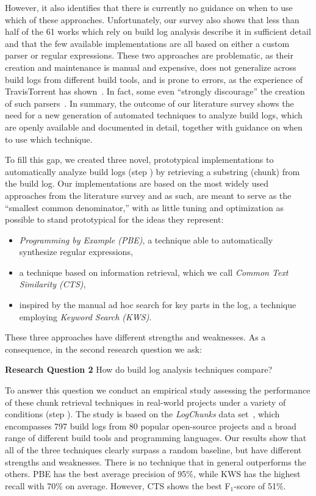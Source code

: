 \documentclass[10pt,journal,compsoc]{IEEEtran}
\newcommand\circlenum[1]{\raisebox{1.2pt}{\textcircled{\hspace{0.35pt}\scriptsize{\raisebox{-.4pt}{#1}}}}}
\begin{document}
However, it also identifies that there is currently no guidance on when
to use which of these
approaches.
Unfortunately, our survey also shows that
less than half of the 61 works which rely on build log analysis
describe it in sufficient detail and that
the few available implementations are all based on either a custom parser
or regular expressions.
These two approaches are problematic, as their creation
and maintenance is manual and expensive, does not generalize across build
logs from different build tools, and is prone to errors,
as the experience of
TravisTorrent has
shown~\cite{beller2017travistorrent,travistorrentquestions}.
In fact, some even ``strongly discourage'' the creation of such
parsers~\cite{urli2018design}.
In summary, the outcome of our literature survey shows the need for a new
generation of automated techniques to analyze build logs, which are
openly available and documented in detail, together with
guidance on when to use which technique.

To fill this gap, we created three novel, prototypical implementations
to automatically analyze build logs (step \circlenum{2}) by retrieving
a substring (chunk)
from the build log.
Our
implementations are based on the most widely used approaches
from the literature survey and as such, are meant to serve as
the ``smallest common denominator,'' with as little tuning and
optimization as possible to stand prototypical for the ideas
they represent:
\begin{itemize}
	\item \emph{Programming by Example (PBE)}, a technique
	able to
	automatically synthesize regular expressions,
	\item a technique based on information
	retrieval, which we call \emph{Common Text Similarity (CTS)},
	\item inspired by the manual ad hoc search for key parts in the
	log, a
	technique employing \emph{Keyword Search (KWS)}.
\end{itemize}

These three approaches have
different strengths and weaknesses.
As a consequence,
in the second research question we ask:

\begin{simplebox}[minipage boxed title*=-5cm]{\textbf{Research Question
2}}
How do build log analysis techniques compare?
\end{simplebox}

To answer this question
we conduct an empirical study assessing the performance
of these chunk retrieval techniques in
real-world projects under a variety of conditions (step \circlenum{3}).
The study is based on the \emph{LogChunks} data
set~\cite{brandt2020logchunks}, which encompasses 797 build logs from
80 popular open-source projects and a broad range of different
build tools and programming languages.
Our results show that all of the three techniques
clearly surpass a random baseline, but have different strengths and
weaknesses.
There is no technique that in general outperforms
the others.
PBE has the best average precision of 95\%, while KWS has the highest
recall with 70\% on average.
However, CTS shows the best F$_{1}$-score
of 51\%.
\end{document}

